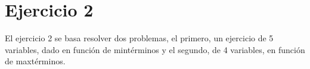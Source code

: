 \newpage
\section{Ejercicio 2}
\noindent
El ejercicio 2 se basa resolver dos problemas, el primero, un ejercicio de 5 variables, dado en funci\'on de mint\'erminos y el segundo, de 4 variables, en funci\'on de maxt\'erminos.\par









